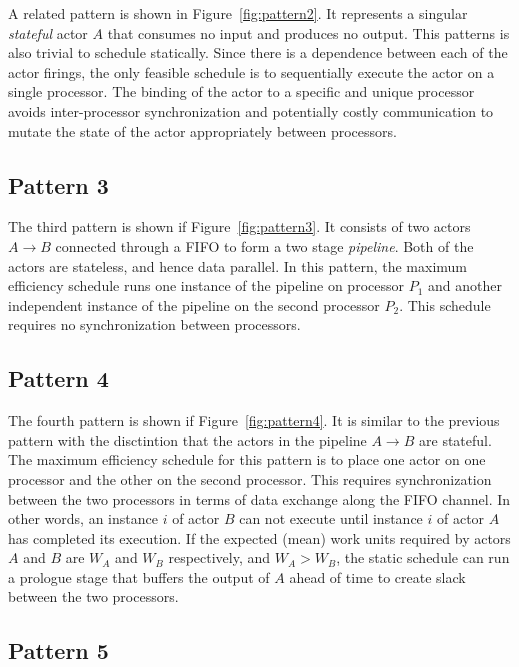 A related pattern is shown in Figure~\ref{fig:pattern2}. It
represents a singular {\it stateful} actor $A$ that consumes no input
and produces no output.
This patterns is also trivial to schedule statically. Since there is a
dependence between each of the actor firings, the only feasible
schedule is to sequentially execute the actor on a single
processor. The binding of the actor to a specific and unique
processor avoids inter-processor synchronization and
potentially costly communication to mutate the state of the actor
appropriately between processors.

\subsection{Pattern 3}

The third pattern is shown if Figure~\ref{fig:pattern3}. It consists
of two actors $A\rightarrow B$ connected through a FIFO to form a two
stage {\it pipeline}. Both of the actors are stateless, and hence data
parallel. In this pattern, the maximum efficiency schedule runs one
instance of the pipeline on processor $P_1$ and another independent
instance of the pipeline on the second processor $P_2$.  This schedule
requires no synchronization between processors.

\subsection{Pattern 4}

The fourth pattern is shown if Figure~\ref{fig:pattern4}. It is
similar to the previous pattern with the disctintion that the actors
in the pipeline $A\rightarrow B$ are stateful. The maximum efficiency
schedule for this pattern is to place one actor on one processor and
the other on the second processor. This requires synchronization
between the two processors in terms of data exchange along the FIFO
channel. In other words, an instance $i$ of actor $B$ can not execute
until instance $i$ of actor $A$ has completed its execution.  If the
expected (mean) work units required by actors $A$ and $B$ are $W_A$
and $W_B$ respectively, and $W_A > W_B$, the static schedule can
run a prologue stage that buffers the output of $A$ ahead of time to
create slack between the two processors.

\subsection{Pattern 5}


